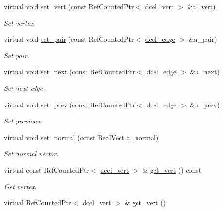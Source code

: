 \begin{DoxyCompactItemize}
virtual void \hyperlink{classdcel__edge_a92c86314c8c7b4cc0bf3e41d14939eb2}{set\+\_\+vert} (const Ref\+Counted\+Ptr$<$ \hyperlink{classdcel__vert}{dcel\+\_\+vert} $>$ \&a\+\_\+vert)
\begin{DoxyCompactList}\small\item\em Set vertex. \end{DoxyCompactList}\item 
virtual void \hyperlink{classdcel__edge_aaa39e43107bd004221aafc4b8709a8a2}{set\+\_\+pair} (const Ref\+Counted\+Ptr$<$ \hyperlink{classdcel__edge}{dcel\+\_\+edge} $>$ \&a\+\_\+pair)
\begin{DoxyCompactList}\small\item\em Set pair. \end{DoxyCompactList}\item 
virtual void \hyperlink{classdcel__edge_a24a8fa1a96dc8d99db81dd046e317cdd}{set\+\_\+next} (const Ref\+Counted\+Ptr$<$ \hyperlink{classdcel__edge}{dcel\+\_\+edge} $>$ \&a\+\_\+next)
\begin{DoxyCompactList}\small\item\em Set next edge. \end{DoxyCompactList}\item 
virtual void \hyperlink{classdcel__edge_ac195585b718a1f640fbcac48af6dbbe6}{set\+\_\+prev} (const Ref\+Counted\+Ptr$<$ \hyperlink{classdcel__edge}{dcel\+\_\+edge} $>$ \&a\+\_\+prev)
\begin{DoxyCompactList}\small\item\em Set previous. \end{DoxyCompactList}\item 
virtual void \hyperlink{classdcel__edge_a826bc0a0a2fc27ee5e7868c970d702ed}{set\+\_\+normal} (const Real\+Vect a\+\_\+normal)
\begin{DoxyCompactList}\small\item\em Set normal vector. \end{DoxyCompactList}\item 
virtual const Ref\+Counted\+Ptr$<$ \hyperlink{classdcel__vert}{dcel\+\_\+vert} $>$ \& \hyperlink{classdcel__edge_a8b97c67c2ba83058004886bb0f4b07f3}{get\+\_\+vert} () const 
\begin{DoxyCompactList}\small\item\em Get vertex. \end{DoxyCompactList}\item 
virtual Ref\+Counted\+Ptr$<$ \hyperlink{classdcel__vert}{dcel\+\_\+vert} $>$ \& \hyperlink{classdcel__edge_a01970e877a80c62c44a163c468620c05}{get\+\_\+vert} ()

\end{DoxyCompactItemize}
